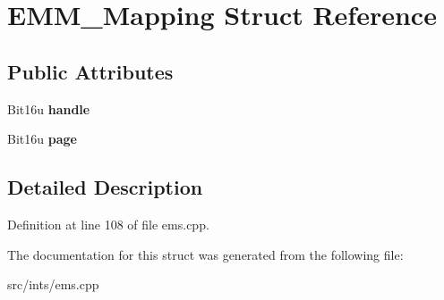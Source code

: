 \hypertarget{structEMM__Mapping}{\section{E\-M\-M\-\_\-\-Mapping Struct Reference}
\label{structEMM__Mapping}
}
\subsection*{Public Attributes}
\begin{DoxyCompactItemize}
\item 
\hypertarget{structEMM__Mapping_ad13a2505af53bc579fa4c22f16662352}{Bit16u {\bfseries handle}}\label{structEMM__Mapping_ad13a2505af53bc579fa4c22f16662352}

\item 
\hypertarget{structEMM__Mapping_a6baabf698f20e90db2a2c5ec18505237}{Bit16u {\bfseries page}}\label{structEMM__Mapping_a6baabf698f20e90db2a2c5ec18505237}

\end{DoxyCompactItemize}


\subsection{Detailed Description}


Definition at line 108 of file ems.\-cpp.



The documentation for this struct was generated from the following file\-:\begin{DoxyCompactItemize}
\item 
src/ints/ems.\-cpp\end{DoxyCompactItemize}
